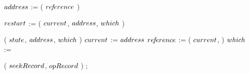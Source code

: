 \begin{limitscope}
{\begin{algorithm}[tb]
{{			\Repeat{\True}
	    {
			   \label{lin:local-seek|successor:while:traversal:begin}
				
				 $address$ := \GetAddress( $re\!f\!erence$ )\;	
				
				 \BlankLine
				
				 $\restart$ := \Move( $current$, $address$, $which$ )\;
				 \label{lin:local-seek|successor:while:traversal:move}
			   \If{$\restart$}
			   {
				    \Break\;
						\label{lin:local-seek|successor:while:traversal:restart}
			   }  
				 
				 \AddToTop( $state$, $address$, $which$ )\;
				 \label{lin:local-seek|successor:while:traversal:stack}
				 \label{lin:local-seek|successor:while:traversal:advance:begin}
			   $current$ := $address$\;
			   $re\!f\!erence$ := \GetChild( $current$, \LEFT{} )\;
			   $which$ := \LEFT{}\;
				 \label{lin:local-seek|successor:while:traversal:advance:end}
				 \label{lin:local-seek|successor:while:traversal:end}
			}
			\label{lin:local-seek|successor:while:end}
	 }
	
	
	 \BlankLine
	
	 \PopulateSeekRecord( $seekRecord$, $opRecord$ )\;
	 \Return \True;
	 \label{lin:local-seek|successor:end}
}
\end{algorithm}

}


\end{limitscope}